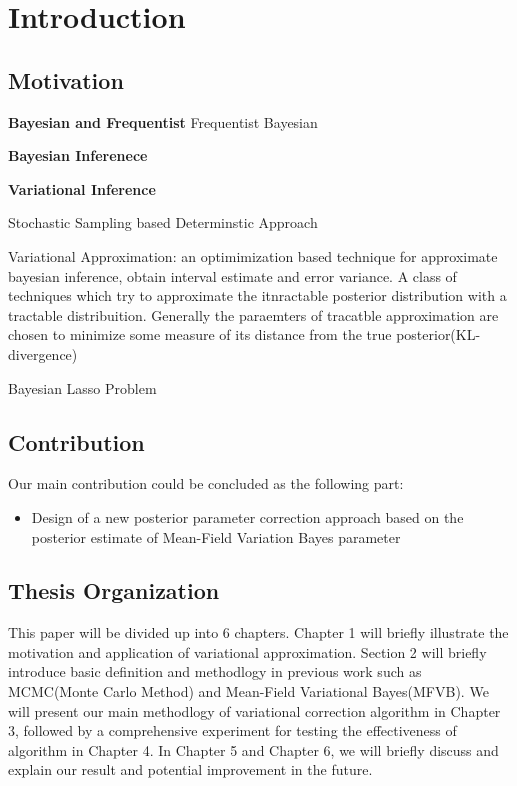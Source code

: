 \chapter{Introduction}
\label{Chapter1}
\section{Motivation}

\textbf{Bayesian and Frequentist}
Frequentist
Bayesian

\textbf{Bayesian Inferenece}

\textbf{Variational Inference}

Stochastic Sampling based
Determinstic Approach



Variational Approximation: an optimimization based technique for approximate bayesian inference, obtain interval estimate and error variance.
A class of techniques which try to approximate the itnractable posterior distribution with a tractable distribuition. Generally the paraemters of tracatble approximation are chosen to minimize some measure of its distance from the true posterior(KL-divergence)


Bayesian Lasso Problem





\section{Contribution}
Our main contribution could be concluded as the following part:
\begin{itemize}
	\item Design of a new posterior parameter correction approach based on the posterior estimate of Mean-Field Variation Bayes parameter 
\end{itemize}



\section{Thesis Organization}
This paper will be divided up into 6 chapters. Chapter 1 will briefly illustrate the motivation and application of variational approximation. Section 2 will briefly introduce basic definition and methodlogy in previous work such as MCMC(Monte Carlo Method) and Mean-Field Variational Bayes(MFVB). We will present our main methodlogy of variational correction algorithm in Chapter 3, followed by a comprehensive experiment for testing the effectiveness of algorithm in Chapter 4. In Chapter 5 and Chapter 6, we will briefly discuss and explain our result and potential improvement in the future. 



 